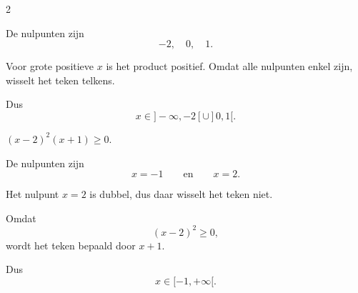 \documentclass{ximera}
\begin{document}
\begin{oefening}[Tekenschema's]{\oefU\ESS}
\begin{multicols}{2}
\begin{question}
\begin{oplossing}
De nulpunten zijn
\[
-2,\quad0,\quad1.
\]

Voor grote positieve $x$ is het product positief.
Omdat alle nulpunten enkel zijn, wisselt het teken telkens.

Dus
\[
x\in]-\infty,-2[
\cup
]0,1[.
\]
\end{oplossing}
\end{question}


\begin{question}
$(x-2)^2(x+1)\geq0$.

\begin{oplossing}
De nulpunten zijn
\[
x=-1
\qquad\text{en}\qquad
x=2.
\]

Het nulpunt $x=2$ is dubbel, dus daar wisselt het teken niet.

Omdat
\[
(x-2)^2\geq0,
\]
wordt het teken bepaald door $x+1$.

Dus
\[
x\in[-1,+\infty[.
\]
\end{oplossing}
\end{question}

\end{multicols}

\end{oefening}

\end{document}
